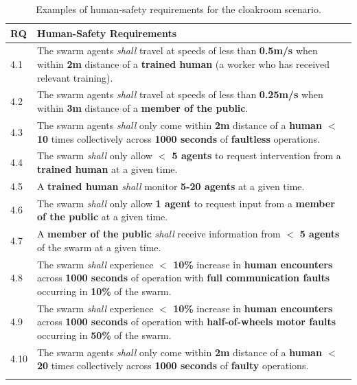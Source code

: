 \documentclass[runningheads]{llncs}
\begin{document}
\begin{table}[!h]
	\centering
	\begin{tabular}{p{6mm} p{116mm}}
		RQ & \textbf{Human-Safety Requirements} \\
		\hline
		4.1 & The swarm agents \emph{shall} travel at speeds of less than \textbf{0.5m/s} when within \textbf{2m} distance of a \textbf{trained human} (a worker who has received relevant training).
		\\ 
		\hline
		4.2 & The swarm agents \emph{shall} travel at speeds of less than \textbf{0.25m/s} when within \textbf{3m} distance of a \textbf{member of the public}.
		\\ 
		\hline
		4.3 & The swarm agents \emph{shall} only come within \textbf{2m} distance of a \textbf{human $<$ 10} times collectively across \textbf{1000 seconds} of \textbf{faultless} operations.
		\\ 
		\hline
		4.4 & The swarm \emph{shall} only allow \textbf{$<$ 5 agents} to request intervention from a \textbf{trained human} at a given time.
		\\ 
		\hline
		4.5 & A \textbf{trained human} \emph{shall} monitor \textbf{5-20 agents} at a given time.
		\\ 
		\hline
		4.6 & The swarm \emph{shall} only allow \textbf{1 agent} to request input from a \textbf{member of the public} at a given time.
		\\ 
		\hline
		4.7 & A \textbf{member of the public} \emph{shall} receive  information from $<$ \textbf{5 agents} of the swarm at a given time.
		\\ 
		\hline
		4.8 & The swarm \emph{shall} experience \textbf{$<$ 10\%} increase in \textbf{human encounters} across \textbf{1000 seconds} of operation with \textbf{full communication faults} occurring in \textbf{10\%} of the swarm. \\
		\hline
		4.9 & The swarm \emph{shall} experience \textbf{$<$ 10\%} increase in \textbf{human encounters }across \textbf{1000 seconds} of operation with \textbf{half-of-wheels motor faults} occurring in \textbf{50\%} of the swarm.\\
		\hline
		4.10 & The swarm agents \emph{shall} only come within \textbf{2m} distance of a \textbf{human $<$ 20} times collectively across \textbf{1000 seconds} of \textbf{faulty} operations.
		\\				
		\hline \\[-1\medskipamount]
	\end{tabular}
	\caption{\label{tab:human-s}Examples of human-safety requirements for the cloakroom scenario.}
	\vspace{-4ex}
\end{table}   
\end{document}
